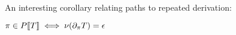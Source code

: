 An interesting corollary relating paths to repeated derivation:
\begin{corollary}
  $\pi \in P[\![ T ]\!] \iff \nu(\partial_{\pi}{T}) = \epsilon$
\end{corollary}
